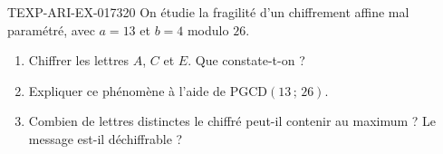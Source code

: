 \begin{exercice}{TEXP-ARI-EX-017}{3}{20}
On étudie la fragilité d'un chiffrement affine mal paramétré, avec $a=13$ et
$b=4$ modulo $26$.
\begin{enumerate}
  \item Chiffrer les lettres $A$, $C$ et $E$. Que constate-t-on ?
  \item Expliquer ce phénomène à l'aide de $\mathrm{PGCD}(13\,;\,26)$.
  \item Combien de lettres distinctes le chiffré peut-il contenir au maximum ?
        Le message est-il déchiffrable ?
\end{enumerate}
\end{exercice}
